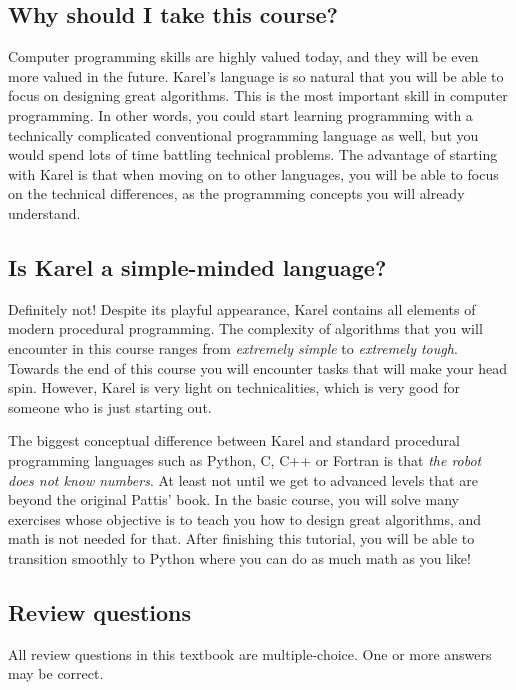\documentclass[article,A4,12pt]{llncs}
\begin{document}
\subsection{Why should I take this course?}

Computer programming skills are highly valued today, and they will be even more 
valued in the future. Karel's language is so natural that you will be able to 
focus on designing great algorithms. This is the most important skill in 
computer programming. In other words, you could start learning programming 
with a technically 
complicated conventional programming language as well, but you would spend lots of time 
battling technical problems. The advantage of starting with Karel is that 
when moving on to other languages, you will be able to focus on the technical 
differences, as the programming concepts you will already understand.


\subsection{Is Karel a simple-minded language?}

Definitely not! Despite its playful appearance, Karel contains all elements 
of modern procedural programming. The complexity of algorithms 
that you will encounter in this course ranges from {\em extremely simple} 
to {\em extremely tough}. Towards the end of this course you will encounter 
tasks that will make your head spin. However, Karel is very light on 
technicalities, which is very good for someone who is just starting out.

The biggest conceptual difference between Karel and standard procedural
programming languages such as Python, C, C++ or Fortran is that {\em the robot does not 
know numbers}. At least not until we get to advanced levels that are beyond 
the original Pattis' book. In the basic course, you will solve many exercises 
whose objective is to teach you how to design great algorithms, and math is 
not needed for that. After finishing this tutorial, you will be able to transition 
smoothly to Python where you can do as much math as you like!
 
\subsection{Review questions}

All review questions in this textbook are multiple-choice. One or more 
answers may be correct.
\end{document}
